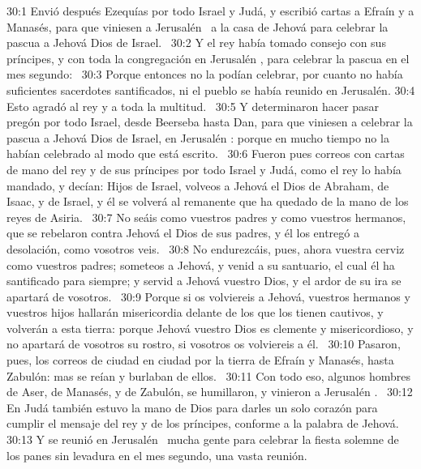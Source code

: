 																														30:1 Envió después Ezequías por todo Israel y Judá, y escribió cartas a Efraín y a Manasés, para que viniesen a Jerusalén  a la casa de Jehová para celebrar la pascua a Jehová Dios de Israel.  
																														30:2 Y el rey había tomado consejo con sus príncipes, y con toda la congregación en Jerusalén , para celebrar la pascua en el mes segundo:  
																														30:3 Porque entonces no la podían celebrar, por cuanto no había suficientes sacerdotes santificados, ni el pueblo se había reunido en Jerusalén. 
																														30:4 Esto agradó al rey y a toda la multitud.  
																														30:5 Y determinaron hacer pasar pregón por todo Israel, desde Beerseba hasta Dan, para que viniesen a celebrar la pascua a Jehová Dios de Israel, en Jerusalén : porque en mucho tiempo no la habían celebrado al modo que está escrito.  
																														30:6 Fueron pues correos con cartas de mano del rey y de sus príncipes por todo Israel y Judá, como el rey lo había mandado, y decían: Hijos de Israel, volveos a Jehová el Dios de Abraham, de Isaac, y de Israel, y él se volverá al remanente que ha quedado de la mano de los reyes de Asiria.  
																														30:7 No seáis como vuestros padres y como vuestros hermanos, que se rebelaron contra Jehová el Dios de sus padres, y él los entregó a desolación, como vosotros veis.  
																														30:8 No endurezcáis, pues, ahora vuestra cerviz como vuestros padres; someteos a Jehová, y venid a su santuario, el cual él ha santificado para siempre; y servid a Jehová vuestro Dios, y el ardor de su ira se apartará de vosotros.  
																														30:9 Porque si os volviereis a Jehová, vuestros hermanos y vuestros hijos hallarán misericordia delante de los que los tienen cautivos, y volverán a esta tierra: porque Jehová vuestro Dios es clemente y misericordioso, y no apartará de vosotros su rostro, si vosotros os volviereis a él.  
																														30:10 Pasaron, pues, los correos de ciudad en ciudad por la tierra de Efraín y Manasés, hasta Zabulón: mas se reían y burlaban de ellos.  
																														30:11 Con todo eso, algunos hombres de Aser, de Manasés, y de Zabulón, se humillaron, y vinieron a Jerusalén .  
																														30:12 En Judá también estuvo la mano de Dios para darles un solo corazón para cumplir el mensaje del rey y de los príncipes, conforme a la palabra de Jehová.  
																														30:13 Y se reunió en Jerusalén  mucha gente para celebrar la fiesta solemne de los panes sin levadura en el mes segundo, una vasta reunión.  
